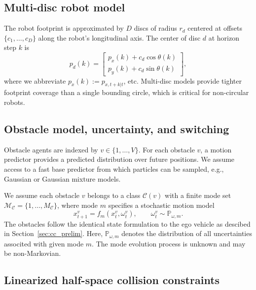 \documentclass[letterpaper,10pt,conference]{ieeeconf}
\begin{document}
\subsection{Multi-disc robot model}\label{sec:multidisc}

The robot footprint is approximated by $D$ discs of radius $r_d$ centered at offsets $\{c_1,\dots,c_D\}$ along the robot's longitudinal axis. The center of disc $d$ at horizon step $k$ is
\begin{equation}\label{eq:disc_center}
p_d(k) = \begin{bmatrix} p_x(k) + c_d \cos\theta(k) \\ p_y(k) + c_d \sin\theta(k) \end{bmatrix},
\end{equation}
where we abbreviate $p_x(k) := p_{x,t+k|t}$, etc. Multi-disc models provide tighter footprint coverage than a single bounding circle, which is critical for non-circular robots.

\subsection{Obstacle model, uncertainty, and switching}

Obstacle agents are indexed by $v \in \{1,\dots,V\}$. For each obstacle $v$, a motion predictor provides a predicted distribution over future positions. We assume access to a fast base predictor from which particles can be sampled, e.g., Gaussian or Gaussian mixture models.

We assume each obstacle $v$ belongs to a class $\mathcal{C}(v)$ with a finite mode set $\mathcal{M}_{\mathcal{C}} = \{1,\dots,M_{\mathcal{C}}\}$, where mode $m$ specifies a stochastic motion model
\begin{equation}\label{eq:obs_dyn}
x_{t+1}^v = f_m(x_t^v, \omega_t^v), \qquad \omega_t^v \sim \mathbb{P}_{\omega,m}.
\end{equation}
The obstacles follow the identical state formulation to the ego vehicle as descibed in Section~\ref{sec:cc_prelim}. Here, $\mathbb{P}_{\omega,m}$ denotes the distribution of all uncertainties associted with given mode $m$.
The mode evolution process is unknown and may be non-Markovian.

\subsection{Linearized half-space collision constraints}\label{sec:linearized}
\end{document}
